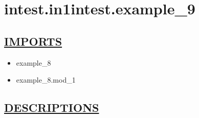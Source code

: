 \chapter*{intest.in1intest.example\_9}

\section*{\underline{IMPORTS}}
\begin{itemize}
\item example\_8
\item example\_8.mod\_1
\end{itemize}

\section*{\underline{DESCRIPTIONS}}
